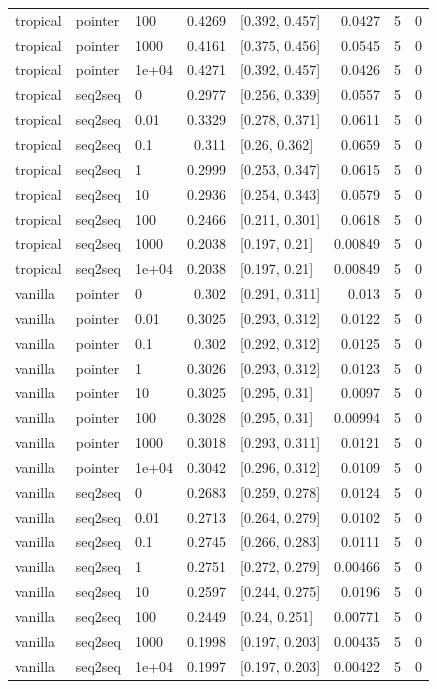 \documentclass[10pt]{article}
\begin{document}
{\begin{longtable}{lllrlrrr}
tropical & pointer & 100 & 0.4269 & [0.392, 0.457] & 0.0427 & 5 & 0\\
tropical & pointer & 1000 & 0.4161 & [0.375, 0.456] & 0.0545 & 5 & 0\\
tropical & pointer & 1e+04 & 0.4271 & [0.392, 0.457] & 0.0426 & 5 & 0\\
tropical & seq2seq & 0 & 0.2977 & [0.256, 0.339] & 0.0557 & 5 & 0\\
tropical & seq2seq & 0.01 & 0.3329 & [0.278, 0.371] & 0.0611 & 5 & 0\\
tropical & seq2seq & 0.1 & 0.311 & [0.26, 0.362] & 0.0659 & 5 & 0\\
tropical & seq2seq & 1 & 0.2999 & [0.253, 0.347] & 0.0615 & 5 & 0\\
tropical & seq2seq & 10 & 0.2936 & [0.254, 0.343] & 0.0579 & 5 & 0\\
tropical & seq2seq & 100 & 0.2466 & [0.211, 0.301] & 0.0618 & 5 & 0\\
tropical & seq2seq & 1000 & 0.2038 & [0.197, 0.21] & 0.00849 & 5 & 0\\
tropical & seq2seq & 1e+04 & 0.2038 & [0.197, 0.21] & 0.00849 & 5 & 0\\
vanilla & pointer & 0 & 0.302 & [0.291, 0.311] & 0.013 & 5 & 0\\
vanilla & pointer & 0.01 & 0.3025 & [0.293, 0.312] & 0.0122 & 5 & 0\\
vanilla & pointer & 0.1 & 0.302 & [0.292, 0.312] & 0.0125 & 5 & 0\\
vanilla & pointer & 1 & 0.3026 & [0.293, 0.312] & 0.0123 & 5 & 0\\
vanilla & pointer & 10 & 0.3025 & [0.295, 0.31] & 0.0097 & 5 & 0\\
vanilla & pointer & 100 & 0.3028 & [0.295, 0.31] & 0.00994 & 5 & 0\\
vanilla & pointer & 1000 & 0.3018 & [0.293, 0.311] & 0.0121 & 5 & 0\\
vanilla & pointer & 1e+04 & 0.3042 & [0.296, 0.312] & 0.0109 & 5 & 0\\
vanilla & seq2seq & 0 & 0.2683 & [0.259, 0.278] & 0.0124 & 5 & 0\\
vanilla & seq2seq & 0.01 & 0.2713 & [0.264, 0.279] & 0.0102 & 5 & 0\\
vanilla & seq2seq & 0.1 & 0.2745 & [0.266, 0.283] & 0.0111 & 5 & 0\\
vanilla & seq2seq & 1 & 0.2751 & [0.272, 0.279] & 0.00466 & 5 & 0\\
vanilla & seq2seq & 10 & 0.2597 & [0.244, 0.275] & 0.0196 & 5 & 0\\
vanilla & seq2seq & 100 & 0.2449 & [0.24, 0.251] & 0.00771 & 5 & 0\\
vanilla & seq2seq & 1000 & 0.1998 & [0.197, 0.203] & 0.00435 & 5 & 0\\
vanilla & seq2seq & 1e+04 & 0.1997 & [0.197, 0.203] & 0.00422 & 5 & 0\\
\bottomrule
\end{longtable}
}
\end{document}
